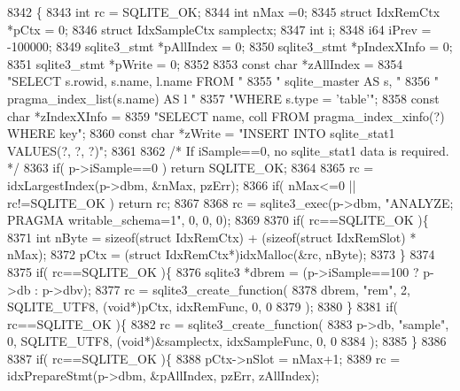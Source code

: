 \begin{DoxyCode}
8342                                                            \{
8343   \textcolor{keywordtype}{int} rc = SQLITE_OK;
8344   \textcolor{keywordtype}{int} nMax =0;
8345   \textcolor{keyword}{struct }IdxRemCtx *pCtx = 0;
8346   \textcolor{keyword}{struct }IdxSampleCtx samplectx; 
8347   \textcolor{keywordtype}{int} i;
8348   i64 iPrev = -100000;
8349   sqlite3_stmt *pAllIndex = 0;
8350   sqlite3_stmt *pIndexXInfo = 0;
8351   sqlite3_stmt *pWrite = 0;
8352 
8353   \textcolor{keyword}{const} \textcolor{keywordtype}{char} *zAllIndex =
8354     \textcolor{stringliteral}{"SELECT s.rowid, s.name, l.name FROM "}
8355     \textcolor{stringliteral}{"  sqlite\_master AS s, "}
8356     \textcolor{stringliteral}{"  pragma\_index\_list(s.name) AS l "}
8357     \textcolor{stringliteral}{"WHERE s.type = 'table'"};
8358   \textcolor{keyword}{const} \textcolor{keywordtype}{char} *zIndexXInfo = 
8359     \textcolor{stringliteral}{"SELECT name, coll FROM pragma\_index\_xinfo(?) WHERE key"};
8360   \textcolor{keyword}{const} \textcolor{keywordtype}{char} *zWrite = \textcolor{stringliteral}{"INSERT INTO sqlite\_stat1 VALUES(?, ?, ?)"};
8361 
8362   \textcolor{comment}{/* If iSample==0, no sqlite\_stat1 data is required. */}
8363   \textcolor{keywordflow}{if}( p->iSample==0 ) \textcolor{keywordflow}{return} SQLITE_OK;
8364 
8365   rc = idxLargestIndex(p->dbm, &nMax, pzErr);
8366   \textcolor{keywordflow}{if}( nMax<=0 || rc!=SQLITE_OK ) \textcolor{keywordflow}{return} rc;
8367 
8368   rc = sqlite3_exec(p->dbm, \textcolor{stringliteral}{"ANALYZE; PRAGMA writable\_schema=1"}, 0, 0, 0);
8369 
8370   \textcolor{keywordflow}{if}( rc==SQLITE_OK )\{
8371     \textcolor{keywordtype}{int} nByte = \textcolor{keyword}{sizeof}(\textcolor{keyword}{struct }IdxRemCtx) + (sizeof(struct IdxRemSlot) * nMax);
8372     pCtx = (\textcolor{keyword}{struct }IdxRemCtx*)idxMalloc(&rc, nByte);
8373   \}
8374 
8375   \textcolor{keywordflow}{if}( rc==SQLITE_OK )\{
8376     sqlite3 *dbrem = (p->iSample==100 ? p->db : p->dbv);
8377     rc = sqlite3_create_function(
8378         dbrem, \textcolor{stringliteral}{"rem"}, 2, SQLITE_UTF8, (\textcolor{keywordtype}{void}*)pCtx, idxRemFunc, 0, 0
8379     );
8380   \}
8381   \textcolor{keywordflow}{if}( rc==SQLITE_OK )\{
8382     rc = sqlite3_create_function(
8383         p->db, \textcolor{stringliteral}{"sample"}, 0, SQLITE_UTF8, (\textcolor{keywordtype}{void}*)&samplectx, idxSampleFunc, 0, 0
8384     );
8385   \}
8386 
8387   \textcolor{keywordflow}{if}( rc==SQLITE_OK )\{
8388     pCtx->nSlot = nMax+1;
8389     rc = idxPrepareStmt(p->dbm, &pAllIndex, pzErr, zAllIndex);

\end{DoxyCode}
